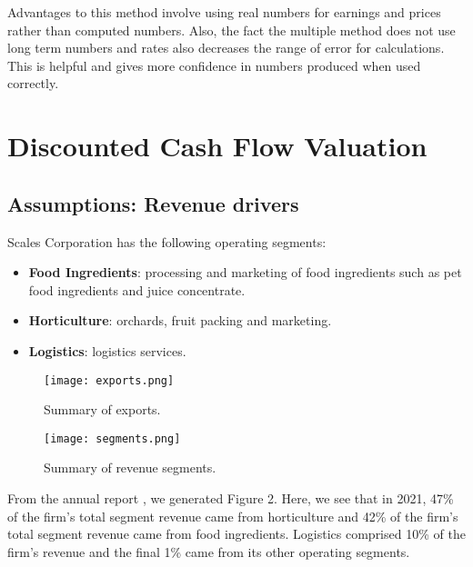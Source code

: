 \documentclass{article}
\begin{document}
Advantages to this method involve using real numbers for earnings and prices rather than computed numbers. Also, the fact the multiple method does not use long term numbers and rates also decreases the range of error for calculations. This is helpful and gives more confidence in numbers produced when used correctly.  


\newpage
\section{Discounted Cash Flow Valuation}
\subsection{Assumptions: Revenue drivers}
Scales Corporation has the following operating segments:
\begin{itemize}
    \item \textbf{Food Ingredients}: processing and marketing of food ingredients such as pet food ingredients and juice concentrate.
    \item \textbf{Horticulture}: orchards, fruit packing and marketing.
    \item \textbf{Logistics}:  logistics services.
\end{itemize}

\begin{figure}[h]
  \centering
  \begin{minipage}[b]{0.45\textwidth}
    \texttt{[image: exports.png]}
    \caption{Summary of exports.}
  \end{minipage}
  \hfill
  \begin{minipage}[b]{0.45\textwidth}
    \texttt{[image: segments.png]}
    \caption{Summary of revenue segments.}
  \end{minipage}
\end{figure}

\noindent
From the annual report \cite{2021annual_report}, we generated Figure 2. Here, we see that in 2021, 47\% of the firm's total segment revenue came from horticulture and 42\% of the firm's total segment revenue came from food ingredients. Logistics comprised 10\% of the firm's revenue and the final 1\% came from its other operating segments. \\
\end{document}
